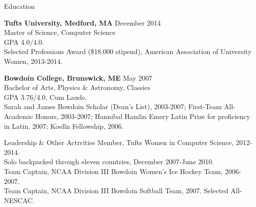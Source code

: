 \documentclass{resume} %
\begin{document}
\begin{rSection}{Education}

{\bf Tufts University, Medford, MA} \hfill {December 2014} \\
Master of Science, Computer Science\\
GPA 4.0/4.0. \smallskip \\
Selected Professions Award (\$18,000 stipend), American Association of University Women, 2013-2014. \smallbreak

{\bf Bowdoin College, Brunswick, ME} \hfill {May 2007} \\
Bachelor of Arts, Physics \& Astronomy, Classics \\
GPA 3.76/4.0, Cum Laude.  \smallskip \\
Sarah and James Bowdoin Scholar (Dean's List), 2003-2007; First-Team All-Academic Honors, 2003-2007; Hannibal Hamlin Emery Latin Prize for proficiency in Latin, 2007; Koelln Fellowship, 2006.
\end{rSection}



\begin{rSection}{Leadership \& Other Activities}
Member, Tufts Women in Computer Science, 2012-2014. \\
Solo backpacked through eleven countries, December 2007-June 2010. \\
Team Captain, NCAA Division III Bowdoin Women's Ice Hockey Team, 2006-2007.\\
Team Captain, NCAA Division III Bowdoin Softball Team, 2007. Selected All-NESCAC.\\
\end{rSection}








\end{document}
